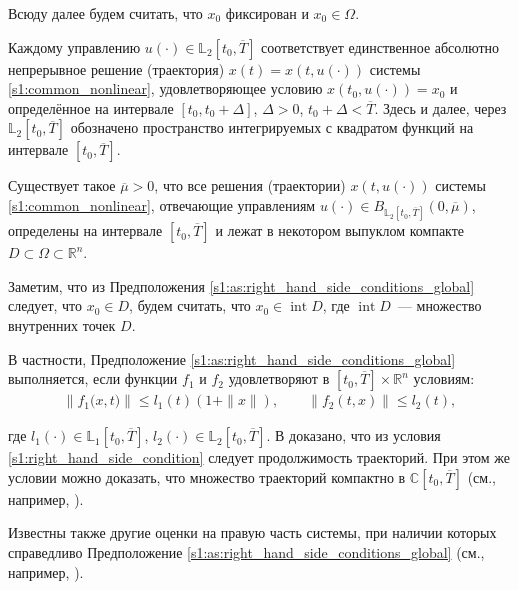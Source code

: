 \documentclass[../main.tex]{subfiles}
\begin{document}
Всюду далее будем считать, что $x_0$ фиксирован и  $x_0 \in  \Omega $. 
    
Каждому управлению $ u(\cdot) \in \mathbb{L}_2[t_0, \overline{T}] $ соответствует единственное абсолютно непрерывное решение (траектория) $ x(t)=x(t,u(\cdot)) $ системы \eqref{s1:common_nonlinear}, удовлетворяющее условию $ x(t_0, u(\cdot)) = x_0$ и определённое на интервале $ [t_0, t_0 + \Delta] $, $\Delta > 0$, $ t_0 + \Delta < \overline{T}$.
Здесь и далее, через  $\mathbb{L}_2[t_0, \overline{T}] $ обозначено пространство интегрируемых с квадратом функций на интервале $[t_0, \overline{T}]$. 

\begin{assumption}\label{s1:as:right_hand_side_conditions_global}
    Существует такое $\overline{\mu} > 0 $, что все решения (траектории) $ x(t, u(\cdot)) $ системы \eqref{s1:common_nonlinear}, отвечающие управлениям $u(\cdot) \in B_{\mathbb{L}_2[t_0, \overline{T}]}(0,\overline{\mu})$,  определены на интервале $ [t_0,\overline{T}] $ и лежат в некотором выпуклом компакте $D \subset \Omega \subset \mathbb{R}^n$. 
\end{assumption}
    
Заметим, что из Предположения  \ref{s1:as:right_hand_side_conditions_global} следует, что $x_0 \in D$, будем считать, что $x_0 \in \operatorname{int} D$, где $\operatorname{int} D $~--- множество внутренних точек $D$.

В частности, Предположение \ref{s1:as:right_hand_side_conditions_global} выполняется, если  функции $f_1$ и $f_2$ удовлетворяют в $ [t_0, \overline{T}] \times \mathbb{R}^n$ условиям:
\begin{gather}\label{s1:right_hand_side_condition}
    \left\|f_1\big(x,t\big) \right\| \leqslant l_1(t) (1 + \|x\|), \qquad  \left\| f_2(t,x) \right\| \leqslant l_2(t), 
\end{gather}
    
где $ l_1(\cdot) \in  \mathbb{L}_1[t_0, \overline{T}] $, $ l_2(\cdot) \in  \mathbb{L}_2[t_0, \overline{T}]$.
В \cite[Теорема 5]{Fillipov2} доказано, что из условия \eqref{s1:right_hand_side_condition} следует продолжимость траекторий. 
При этом же условии можно доказать, что множество траекторий компактно в $\mathbb{C}[t_0, \overline{T}]$ (см., например, \cite{GusZyk, Guseinov2022}).
    
Известны также другие  оценки на правую часть системы, при наличии которых справедливо Предположение  \ref{s1:as:right_hand_side_conditions_global} (см., например, \cite{Fillipov2, Guseinov2010}).
    
\end{document}
